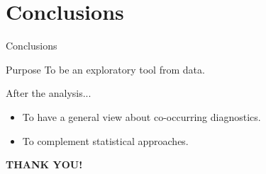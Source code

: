 \documentclass[11pt]{beamer}
\begin{document}
\section{Conclusions}
	\begin{frame}{Conclusions}
		\begin{block}{Purpose}
        To be an exploratory tool from data.
        \end{block}
        
        \begin{block}{After the analysis...}
            \begin{itemize}
                \item To have a general view about co-occurring diagnostics.
                \item To complement statistical approaches.
            \end{itemize}
        \end{block}
	\end{frame}

\begin{frame}
    \Huge{\centerline{\textbf{THANK YOU!}}}
\end{frame}
\end{document}
